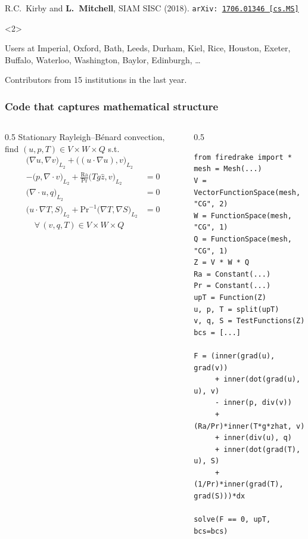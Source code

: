 \documentclass[presentation,aspectratio=43, 10pt]{beamer}
\newcommand{\arxivlink}[2]{{\texttt{arXiv:\,\href{https://arxiv.org/abs/#1}{#1\,[#2]}}}}
\begin{document}
\begin{frame}
\begin{overlayarea}{\textwidth}{0.6\textheight}
\begin{onlyenv}
\begin{flushright}
{      R.C.~Kirby and \textbf{L.~Mitchell}, SIAM SISC (2018). \arxivlink{1706.01346}{cs.MS}\nocite{Kirby:2018}}
    \end{flushright}
  \end{onlyenv}
  \begin{onlyenv}<2>
    \begin{block}{Users at}
      Imperial, Oxford, Bath, Leeds, Durham, Kiel, Rice, Houston,
      Exeter, Buffalo, Waterloo, Washington, Baylor, Edinburgh, \dots

      Contributors from 15 institutions in the last year.
    \end{block}
  \end{onlyenv}
\end{overlayarea}
\end{frame}

\begin{frame}[fragile]
  \frametitle{Code that captures mathematical structure}
  \begin{columns}
    \begin{column}{0.5\framewidth}
      Stationary Rayleigh--B\'enard convection, find $(u, p, T) \in V\times W\times Q$ s.t.
        \begin{align*}
          {\big(\nabla u, \nabla v\big)}_{L_2} + {\big((u \cdot \nabla u), v\big)}_{L_2} \\
          - {\big(p, \nabla\cdot v\big)}_{L_2} + \frac{\text{Ra}}{\text{Pr}}
          {\big(Tg\hat{z}, v\big)}_{L_2} &= 0 \\
          {\big(\nabla\cdot u, q\big)}_{L_2} &= 0\\
          {\big(u \cdot \nabla T, S\big)}_{L_2}
          + \text{Pr}^{-1} {\big(\nabla T, \nabla S\big)}_{L_2} &= 0\\
          \quad \forall\, (v,q,T) \in V\times W \times Q
        \end{align*}
    \end{column}
      \begin{column}{0.5\framewidth}
\begin{verbatim}
from firedrake import *
mesh = Mesh(...)
V = VectorFunctionSpace(mesh, "CG", 2)
W = FunctionSpace(mesh, "CG", 1)
Q = FunctionSpace(mesh, "CG", 1)
Z = V * W * Q
Ra = Constant(...)
Pr = Constant(...)
upT = Function(Z)
u, p, T = split(upT)
v, q, S = TestFunctions(Z)
bcs = [...]

F = (inner(grad(u), grad(v))
     + inner(dot(grad(u), u), v)
     - inner(p, div(v))
     + (Ra/Pr)*inner(T*g*zhat, v)
     + inner(div(u), q)
     + inner(dot(grad(T), u), S)
     + (1/Pr)*inner(grad(T), grad(S)))*dx

solve(F == 0, upT, bcs=bcs)
\end{verbatim}
      \end{column}
  \end{columns}
\end{frame}
\end{document}
